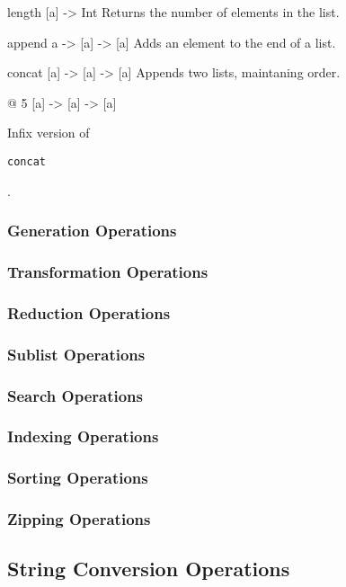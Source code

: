 \documentclass{article}
\def\code#1{\begin{footnotesize}\texttt{#1}\end{footnotesize}}
\begin{document}
\libfunction
  {length}
  {[a] -> Int}
  {Returns the number of elements in the list.}

\libfunction
  {append}
  {a -> [a] -> [a]}
  {Adds an element to the end of a list.}

\libfunction
  {concat}
  {[a] -> [a] -> [a]}
  {Appends two lists, maintaning order.}

\liboperator
  {@}
  {\rightassociative}
  {5}
  {[a] -> [a] -> [a]}
  {Infix version of \code{concat}.}

\subsubsection{Generation Operations}

\subsubsection{Transformation Operations}

\subsubsection{Reduction Operations}

\subsubsection{Sublist Operations}

\subsubsection{Search Operations}

\subsubsection{Indexing Operations}

\subsubsection{Sorting Operations}

\subsubsection{Zipping Operations}

\subsection{String Conversion Operations}
\end{document}
